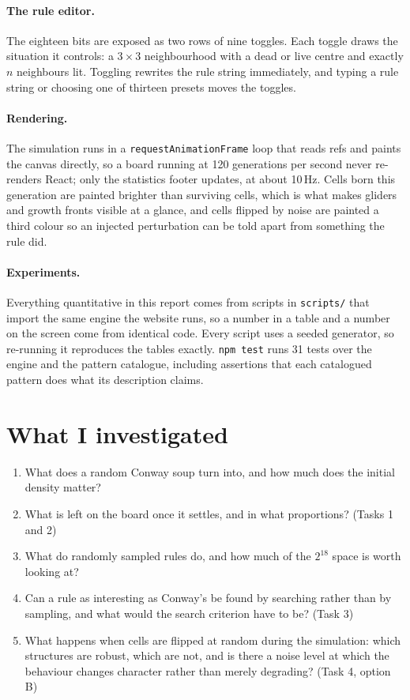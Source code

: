\documentclass[11pt]{article}
\begin{document}
\paragraph{The rule editor.} The eighteen bits are exposed as two rows of nine toggles. Each toggle
draws the situation it controls: a $3\times3$ neighbourhood with a dead or live centre and exactly
$n$ neighbours lit. Toggling rewrites the rule string immediately, and typing a rule string or
choosing one of thirteen presets moves the toggles.

\paragraph{Rendering.} The simulation runs in a \texttt{requestAnimationFrame} loop that reads refs
and paints the canvas directly, so a board running at 120 generations per second never re-renders
React; only the statistics footer updates, at about 10\,Hz. Cells born this generation are painted
brighter than surviving cells, which is what makes gliders and growth fronts visible at a glance,
and cells flipped by noise are painted a third colour so an injected perturbation can be told apart
from something the rule did.

\paragraph{Experiments.} Everything quantitative in this report comes from scripts in
\texttt{scripts/} that import the same engine the website runs, so a number in a table and a number
on the screen come from identical code. Every script uses a seeded generator, so
re-running it reproduces the tables exactly. \texttt{npm test} runs 31 tests over the engine and the
pattern catalogue, including assertions that each catalogued pattern does what its description
claims.

\section{What I investigated}

\begin{enumerate}[leftmargin=1.4em]
  \item What does a random Conway soup turn into, and how much does the initial density matter?
  \item What is left on the board once it settles, and in what proportions? (Tasks 1 and 2)
  \item What do randomly sampled rules do, and how much of the $2^{18}$ space is worth looking at?
  \item Can a rule as interesting as Conway's be found by searching rather than by sampling, and
    what would the search criterion have to be? (Task 3)
  \item What happens when cells are flipped at random during the simulation: which structures are
    robust, which are not, and is there a noise level at which the behaviour changes character
    rather than merely degrading? (Task 4, option B)
\end{enumerate}
\end{document}
